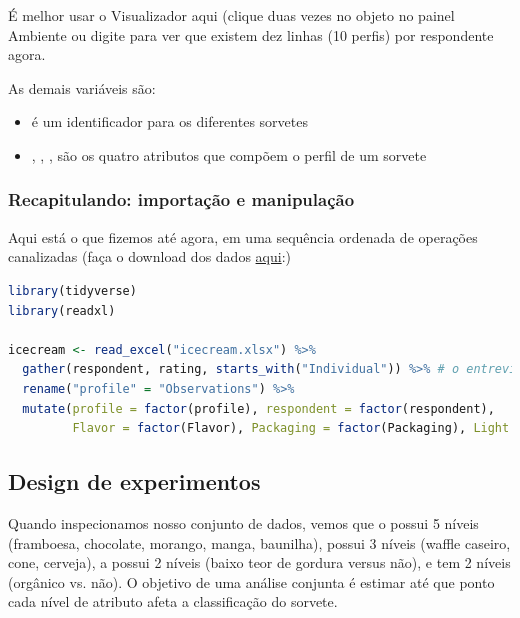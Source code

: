 \documentclass{article}
\begin{document}
É melhor usar o Visualizador aqui (clique duas vezes no  objeto no painel Ambiente ou digite  para ver que existem dez linhas (10 perfis) por respondente agora.

As demais variáveis são:

\begin{itemize}
    \item {} é um identificador para os diferentes sorvetes
    \item {}, , ,  são os quatro atributos que compõem o perfil de um sorvete
\end{itemize}

\subsubsection{Recapitulando: importação e manipulação}

Aqui está o que fizemos até agora, em uma sequência ordenada de operações canalizadas (faça o download dos dados \href{http://users.telenet.be/samuelfranssens/tutorial_data/icecream.xlsx}{aqui}:)
\begin{lstlisting}[language=R]
library(tidyverse)
library(readxl)

icecream <- read_excel("icecream.xlsx") %>% 
  gather(respondent, rating, starts_with("Individual")) %>% # o entrevistado acompanha o respondente, a classificacao armazena as classificacoes do entrevistado e queremos empilhar todas as variaveis que comecam com Individual
  rename("profile" = "Observations") %>% 
  mutate(profile = factor(profile), respondent = factor(respondent),
         Flavor = factor(Flavor), Packaging = factor(Packaging), Light = factor(Light), Organic = factor(Organic))
\end{lstlisting}


\subsection{Design de experimentos}

Quando inspecionamos nosso conjunto de dados, vemos que o  possui 5 níveis (framboesa, chocolate, morango, manga, baunilha),  possui 3 níveis (waffle caseiro, cone, cerveja), a  possui 2 níveis (baixo teor de gordura versus não), e  tem 2 níveis (orgânico vs. não). O objetivo de uma análise conjunta é estimar até que ponto cada nível de atributo afeta a classificação do sorvete.
\end{document}
